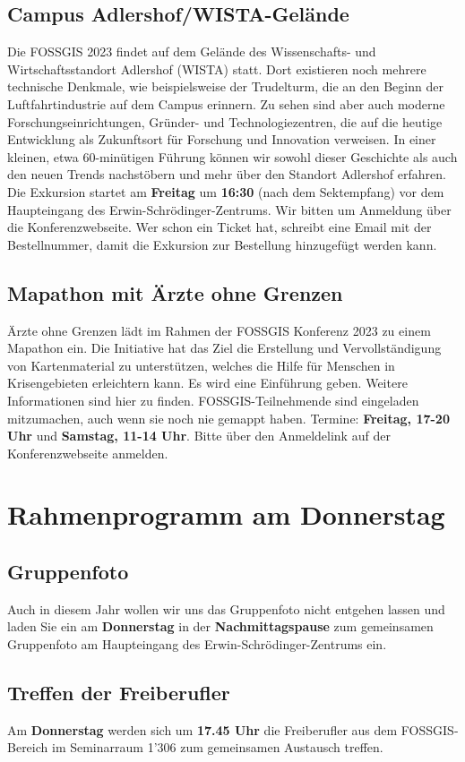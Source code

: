 \subsection*{Campus Adlershof/WISTA-Gelände}
Die FOSSGIS 2023 findet auf dem Gelände des Wissenschafts- und Wirtschaftsstandort Adlershof (WISTA) statt. Dort existieren noch mehrere technische Denkmale, wie beispielsweise der Trudelturm, die an den Beginn der Luftfahrtindustrie auf dem Campus erinnern. Zu sehen sind aber auch moderne Forschungseinrichtungen, Gründer- und Technologiezentren, die auf die heutige Entwicklung als Zukunftsort für Forschung und Innovation verweisen. In einer kleinen, etwa 60-minütigen Führung können wir sowohl dieser Geschichte als auch den neuen Trends nachstöbern und mehr über den Standort Adlershof erfahren.
Die Exkursion startet am {\bfseries Freitag} um {\bfseries 16:30} (nach dem Sektempfang) vor dem Haupteingang des Erwin-Schrödinger-Zentrums. Wir bitten um Anmeldung über die Konferenzwebseite. Wer schon ein Ticket hat, schreibt eine Email mit der Bestellnummer, damit die Exkursion zur Bestellung hinzugefügt werden kann.
\subsection*{Mapathon mit Ärzte ohne Grenzen}
Ärzte ohne Grenzen lädt im Rahmen der FOSSGIS Konferenz 2023 zu einem Mapathon ein. Die Initiative hat das Ziel die Erstellung und Vervollständigung von Kartenmaterial zu unterstützen, welches die Hilfe für Menschen in Krisengebieten erleichtern kann. Es wird eine Einführung geben. Weitere Informationen sind hier zu finden. FOSSGIS-Teilnehmende sind eingeladen mitzumachen, auch wenn sie noch nie gemappt haben.
Termine: {\bfseries Freitag, 17-20 Uhr} und {\bfseries Samstag, 11-14 Uhr}. Bitte über den Anmeldelink auf der Konferenzwebseite anmelden.

\section*{Rahmenprogramm am Donnerstag}
\subsection*{Gruppenfoto}
Auch in diesem Jahr wollen wir uns das Gruppenfoto nicht entgehen lassen und laden Sie ein am {\bfseries Donnerstag} in der {\bfseries Nachmittagspause} zum gemeinsamen Gruppenfoto am Haupteingang des Erwin-Schrödinger-Zentrums ein.

\subsection*{Treffen der Freiberufler}
Am {\bfseries Donnerstag} werden sich um {\bfseries 17.45 Uhr} die Freiberufler aus dem FOSSGIS-Bereich im Seminarraum 1'306 zum gemeinsamen Austausch treffen.

